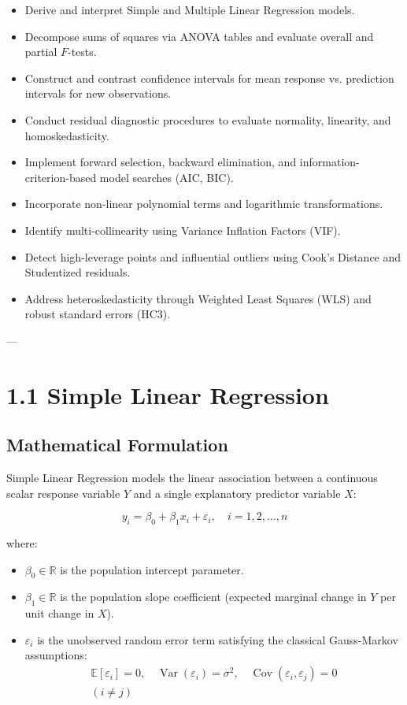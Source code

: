 \documentclass[
]{article}
\begin{document}
\begin{itemize}
\item
  Derive and interpret Simple and Multiple Linear Regression models.
\item
  Decompose sums of squares via ANOVA tables and evaluate overall and
  partial \(F\)-tests.
\item
  Construct and contrast confidence intervals for mean response vs.
  prediction intervals for new observations.
\item
  Conduct residual diagnostic procedures to evaluate normality,
  linearity, and homoskedasticity.
\item
  Implement forward selection, backward elimination, and
  information-criterion-based model searches (AIC, BIC).
\item
  Incorporate non-linear polynomial terms and logarithmic
  transformations.
\item
  Identify multi-collinearity using Variance Inflation Factors (VIF).
\item
  Detect high-leverage points and influential outliers using Cook's
  Distance and Studentized residuals.
\item
  Address heteroskedasticity through Weighted Least Squares (WLS) and
  robust standard errors (HC3).
\end{itemize}

---

\textbf{ }

\section{1.1 Simple Linear Regression}

\textbf{ }

\subsection{Mathematical Formulation}

Simple Linear Regression models the linear association between a
continuous scalar response variable \(Y\) and a single explanatory
predictor variable \(X\):

\[y_{i} = \beta_{0} + \beta_{1}x_{i} + \varepsilon_{i},\quad i = 1,2,\ldots,n\]

where:

\begin{itemize}
\item
  \(\beta_{0} \in \mathbb{R}\) is the population intercept parameter.
\item
  \(\beta_{1} \in \mathbb{R}\) is the population slope coefficient
  (expected marginal change in \(Y\) per unit change in \(X\)).
\item
  \(\varepsilon_{i}\) is the unobserved random error term satisfying the
  classical Gauss-Markov assumptions: \[\begin{array}{r}
  \mathbb{E}\left\lbrack \varepsilon_{i} \right\rbrack = 0,\quad\operatorname{Var}(\varepsilon_{i}) = \sigma^{2},\quad\operatorname{Cov}(\varepsilon_{i},\varepsilon_{j}) = 0 \\
  (i \neq j)
  \end{array}\]
\end{itemize}
\end{document}
